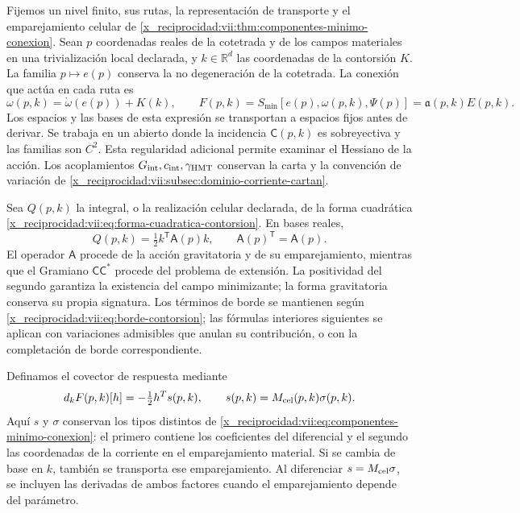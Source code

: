 Fijemos un nivel finito, sus rutas, la representación de transporte y
el emparejamiento celular de
\ref{x_reciprocidad:vii:thm:componentes-minimo-conexion}. Sean \(p\) coordenadas
reales de la cotetrada y de los campos materiales en una trivialización
local declarada, y \(k\in\mathbb R^d\) las coordenadas de la
contorsión \(K\). La familia \(p\mapsto e(p)\) conserva la
no degeneración de la cotetrada. La conexión que actúa en cada ruta es
\begin{equation}
 \omega(p,k)=\mathring\omega(e(p))+K(k),\qquad
 F(p,k)=S_{\min}[e(p),\omega(p,k),\Psi(p)]
       =\mathfrak a(p,k)E(p,k).
 \label{x_reciprocidad:vii:eq:accion-minima-en-contorsion}
\end{equation}
Los espacios y las bases de esta expresión se transportan a espacios
fijos antes de derivar. Se trabaja en un abierto donde la incidencia
\(\mathsf C(p,k)\) es sobreyectiva y las familias son \(C^2\).
Esta regularidad adicional permite examinar el Hessiano de la acción.
Los acoplamientos \(G_{\rm int},c_{\rm int},\gamma_{\rm HMT}\)
conservan la carta y la convención de variación de
\ref{x_reciprocidad:vii:subsec:dominio-corriente-cartan}.

Sea \(Q(p,k)\) la integral, o la realización celular declarada, de
la forma cuadrática
\eqref{x_reciprocidad:vii:eq:forma-cuadratica-contorsion}. En bases reales,
\begin{equation}
 Q(p,k)=\tfrac12 k^{\mathsf T}\mathsf A(p)k,
 \qquad \mathsf A(p)^{\mathsf T}=\mathsf A(p).
 \label{x_reciprocidad:vii:eq:cuadratica-celular-contorsion}
\end{equation}
El operador \(\mathsf A\) procede de la acción gravitatoria y de
su emparejamiento, mientras que el Gramiano
\(\mathsf C\mathsf C^*\) procede del problema de extensión.
La positividad del segundo garantiza la existencia del campo
minimizante; la forma gravitatoria conserva su propia signatura.
Los términos de borde se mantienen según
\eqref{x_reciprocidad:vii:eq:borde-contorsion}; las fórmulas interiores siguientes
se aplican con variaciones admisibles que anulan su contribución, o
con la completación de borde correspondiente.

Definamos el covector de respuesta mediante
\begin{equation}
 d_kF(p,k)[h]= -\tfrac12 h^{\mathsf T}s(p,k),
 \qquad s(p,k)=\mathsf M_{\rm cel}(p,k)\sigma(p,k).
 \label{x_reciprocidad:vii:eq:covector-torsional-minimo}
\end{equation}
Aquí \(s\) y \(\sigma\) conservan los tipos distintos de
\eqref{x_reciprocidad:vii:eq:componentes-minimo-conexion}: el primero contiene los
coeficientes del diferencial y el segundo las coordenadas de la
corriente en el emparejamiento material. Si se cambia de base en
\(k\), también se transporta ese emparejamiento. Al diferenciar
\(s=\mathsf M_{\rm cel}\sigma\), se incluyen las derivadas de
ambos factores cuando el emparejamiento depende del parámetro.

